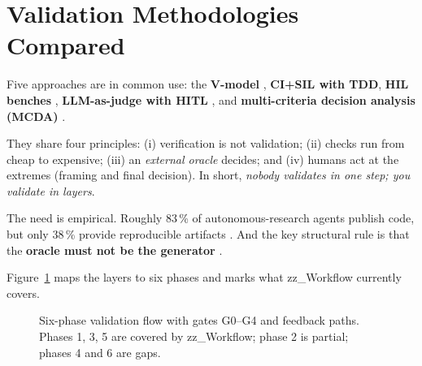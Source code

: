 \documentclass[11pt,a4paper]{article}
\begin{document}
\section{Validation Methodologies Compared}

Five approaches are in common use: the \textbf{V-model} \cite{qmsdoc2026,sheridan2026b},
\textbf{CI+SIL with TDD}, \textbf{HIL benches} \cite{opalrt2026,sheridan2026a},
\textbf{LLM-as-judge with HITL} \cite{futureagi2026,bajestani2026}, and
\textbf{multi-criteria decision analysis (MCDA)} \cite{mcda2026}.

They share four principles: (i) verification is not validation; (ii) checks run from
cheap to expensive; (iii) an \emph{external oracle} decides; and (iv) humans act at
the extremes (framing and final decision). In short, \emph{nobody validates in one step;
you validate in layers}.

The need is empirical. Roughly 83\,\% of autonomous-research agents publish code, but
only 38\,\% provide reproducible artifacts \cite{verifgap2026}. And the key structural
rule is that the \textbf{oracle must not be the generator} \cite{judge2026}.

Figure~\ref{fig:phases} maps the layers to six phases and marks what zz\_Workflow
currently covers.

\begin{figure}[htbp]
\centering
{}
\caption{Six-phase validation flow with gates G0--G4 and feedback paths. Phases 1, 3, 5
are covered by zz\_Workflow; phase 2 is partial; phases 4 and 6 are gaps.}
\label{fig:phases}
\end{figure}
\end{document}
